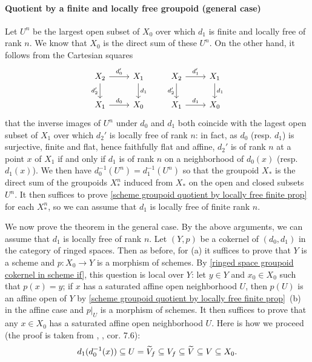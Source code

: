\paragraph{Quotient by a finite and locally free groupoid (general case)}\label{scheme groupoid quotient by locally free finite general case paragraph}
Let $U^n$ be the largest open subset of $X_0$ over which $d_1$ is finite and locally free of rank $n$. We know that $X_0$ is the direct sum of these $U^n$. On the other hand, it follows from the Cartesian squares
\[\begin{tikzcd}
X_2\ar[r,"d_0'"]\ar[d,swap,"d_2'"]&X_1\ar[d,"d_1"]\\
X_1\ar[r,"d_0"]&X_0
\end{tikzcd}\quad\quad \begin{tikzcd}
X_2\ar[r,"d_1'"]\ar[d,swap,"d_2'"]&X_1\ar[d,"d_1"]\\
X_1\ar[r,"d_1"]&X_0
\end{tikzcd}\]
that the inverse images of $U^n$ under $d_0$ and $d_1$ both coincide with the lagest open subset of $X_1$ over which $d_2'$ is locally free of rank $n$: in fact, as $d_0$ (resp. $d_1$) is surjective, finite and flat, hence faithfully flat and affine, $d_2'$ is of rank $n$ at a point $x$ of $X_1$ if and only if $d_1$ is of rank $n$ on a neighborhood of $d_0(x)$ (resp. $d_1(x)$). We then have $d_0^{-1}(U^n)=d_1^{-1}(U^n)$ so that the groupoid $X_*$ is the direct sum of the groupoids $X_*^n$ induced from $X_*$ on the open and closed subsets $U^n$. It then suffices to prove \cref{scheme groupoid quotient by locally free finite prop} for each $X_*^n$, so we can assume that $d_1$ is locally free of finite rank $n$.\par 
We now prove the theorem in the general case. By the above arguments, we can assume that $d_1$ is locally free of rank $n$. Let $(Y,p)$ be a cokernel of $(d_0,d_1)$ in the category of ringed spaces. Then as before, for (a) it suffices to prove that $Y$ is a scheme and $p:X_0\to Y$ is a morphism of schemes. By \cref{ringed space groupoid cokernel in scheme if}, this question is local over $Y$: let $y\in Y$ and $x_0\in X_0$ such that $p(x)=y$; if $x$ has a saturated affine open neighborhood $U$, then $p(U)$ is an affine open of $Y$ by \cref{scheme groupoid quotient by locally free finite prop}~(b) in the affine case and $p|_U$ is a morphism of schemes. It then suffices to prove that any $x\in X_0$ has a saturated affine open neighborhood $U$. Here is how we proceed (the proof is taken from \cite{SGA1}, , cor. 7.6):
\[d_1(d_0^{-1}(x))\subseteq U=\widetilde{V}_f\subseteq V_f\subseteq \widetilde{V}\subseteq V\subseteq X_0.\]

